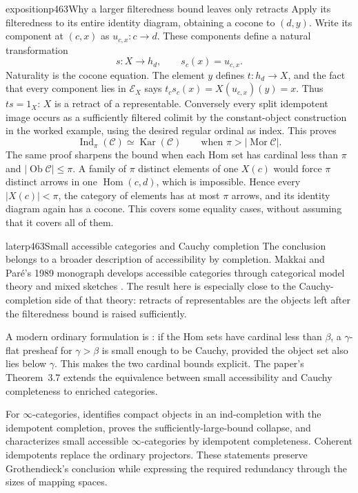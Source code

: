 \begin{dcomment}{exposition}{p463}{Why a larger filteredness bound leaves only retracts}
Apply its filteredness to its entire identity diagram, obtaining a cocone to $(d,y)$. Write its component at $(c,x)$ as $u_{c,x}:c\to d$. These components define a natural transformation
\[
s:X\longrightarrow h_d,\qquad s_c(x)=u_{c,x}.
\]
Naturality is the cocone equation. The element $y$ defines $t:h_d\to X$, and the fact that every component lies in $\mathcal E_X$ says
$t_cs_c(x)=X(u_{c,x})(y)=x$.
Thus $ts=1_X$: $X$ is a retract of a representable. Conversely every split idempotent image occurs as a sufficiently filtered colimit by the constant-object construction in the worked example, using the desired regular ordinal as index. This proves
\[
\operatorname{Ind}_{\pi}(\mathcal C)\simeq
\operatorname{Kar}(\mathcal C)
\qquad\text{when }\pi>|\operatorname{Mor}\mathcal C|.
\]
The same proof sharpens the bound when each Hom set has cardinal less than $\pi$ and $|\operatorname{Ob}\mathcal C|\le\pi$. A family of $\pi$ distinct elements of one $X(c)$ would force $\pi$ distinct arrows in one $\operatorname{Hom}(c,d)$, which is impossible. Hence every $|X(c)|<\pi$, the category of elements has at most $\pi$ arrows, and its identity diagram again has a cocone. This covers some equality cases, without assuming that it covers all of them.
\end{dcomment}

\begin{dcomment}{later}{p463}{Small accessible categories and Cauchy completion}
The conclusion belongs to a broader description of accessibility by completion. Makkai and Par\'e's 1989 monograph develops accessible categories through categorical model theory and mixed sketches \citep{MakkaiPare1989}. The result here is especially close to the Cauchy-completion side of that theory: retracts of representables are the objects left after the filteredness bound is raised sufficiently.

A modern ordinary formulation is \citet[Lemmas~2.5--2.6 and Corollary~2.8]{Tendas2022Continuity}: if the Hom sets have cardinal less than $\beta$, a $\gamma$-flat presheaf for $\gamma>\beta$ is small enough to be Cauchy, provided the object set also lies below $\gamma$. This makes the two cardinal bounds explicit. The paper's Theorem~3.7 extends the equivalence between small accessibility and Cauchy completeness to enriched categories.

For $\infty$-categories, \citet[Lemma~5.4.2.4 and Corollaries~5.4.3.5--5.4.3.6]{Lurie2009HTT} identifies compact objects in an ind-completion with the idempotent completion, proves the sufficiently-large-bound collapse, and characterizes small accessible $\infty$-categories by idempotent completeness. Coherent idempotents replace the ordinary projectors. These statements preserve Grothendieck's conclusion while expressing the required redundancy through the sizes of mapping spaces.
\end{dcomment}

